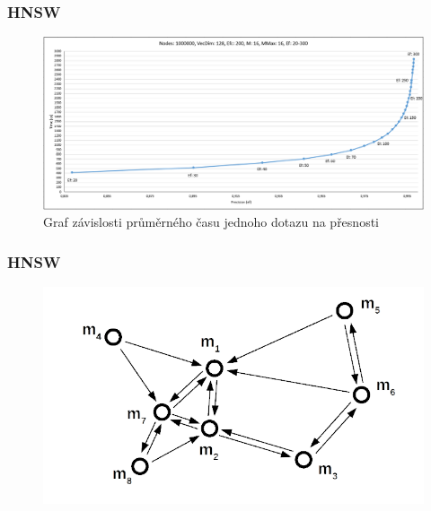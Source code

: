 \documentclass{beamer}
\begin{document}
	\begin{frame}
		\frametitle{HNSW}
		
		\begin{figure}
			\includegraphics[scale=0.34]{figures/graf_hnsw.png}
			\caption{Graf závislosti průměrného času jednoho dotazu na přesnosti}
		\end{figure}
		
	\end{frame}

	\begin{frame}
		\frametitle{HNSW}
		
		\begin{figure}
			\includegraphics[scale=0.34]{figures/HNSW_b1.png}
		\end{figure}
		
	\end{frame}
\end{document}
